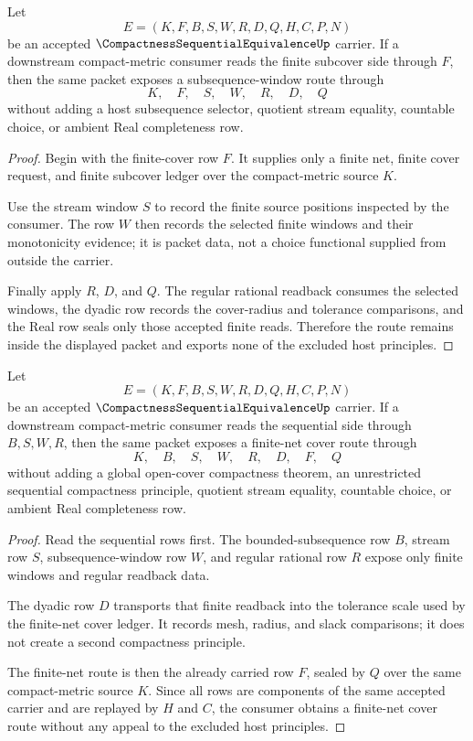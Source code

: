 \begin{theorem}
\label{thm:compactness-sequential-equivalence-finite-subcover-to-subsequence}
Let
$$
E=(K,F,B,S,W,R,D,Q,H,C,P,N)
$$
be an accepted $\CompactnessSequentialEquivalenceUp$ carrier. If a downstream compact-metric consumer reads the finite subcover side through $F$, then the same packet exposes a subsequence-window route through
$$
K,\quad F,\quad S,\quad W,\quad R,\quad D,\quad Q
$$
without adding a host subsequence selector, quotient stream equality, countable choice, or ambient Real completeness row.
\end{theorem}
\begin{proof}
Begin with the finite-cover row $F$. It supplies only a finite net, finite cover request, and finite subcover ledger over the compact-metric source $K$.

Use the stream window $S$ to record the finite source positions inspected by the consumer. The row $W$ then records the selected finite windows and their monotonicity evidence; it is packet data, not a choice functional supplied from outside the carrier.

Finally apply $R$, $D$, and $Q$. The regular rational readback consumes the selected windows, the dyadic row records the cover-radius and tolerance comparisons, and the Real row seals only those accepted finite reads. Therefore the route remains inside the displayed packet and exports none of the excluded host principles.
\end{proof}

\begin{theorem}
\label{thm:compactness-sequential-equivalence-subsequence-to-finite-net}
Let
$$
E=(K,F,B,S,W,R,D,Q,H,C,P,N)
$$
be an accepted $\CompactnessSequentialEquivalenceUp$ carrier. If a downstream compact-metric consumer reads the sequential side through $B,S,W,R$, then the same packet exposes a finite-net cover route through
$$
K,\quad B,\quad S,\quad W,\quad R,\quad D,\quad F,\quad Q
$$
without adding a global open-cover compactness theorem, an unrestricted sequential compactness principle, quotient stream equality, countable choice, or ambient Real completeness row.
\end{theorem}
\begin{proof}
Read the sequential rows first. The bounded-subsequence row $B$, stream row $S$, subsequence-window row $W$, and regular rational row $R$ expose only finite windows and regular readback data.

The dyadic row $D$ transports that finite readback into the tolerance scale used by the finite-net cover ledger. It records mesh, radius, and slack comparisons; it does not create a second compactness principle.

The finite-net route is then the already carried row $F$, sealed by $Q$ over the same compact-metric source $K$. Since all rows are components of the same accepted carrier and are replayed by $H$ and $C$, the consumer obtains a finite-net cover route without any appeal to the excluded host principles.
\end{proof}

